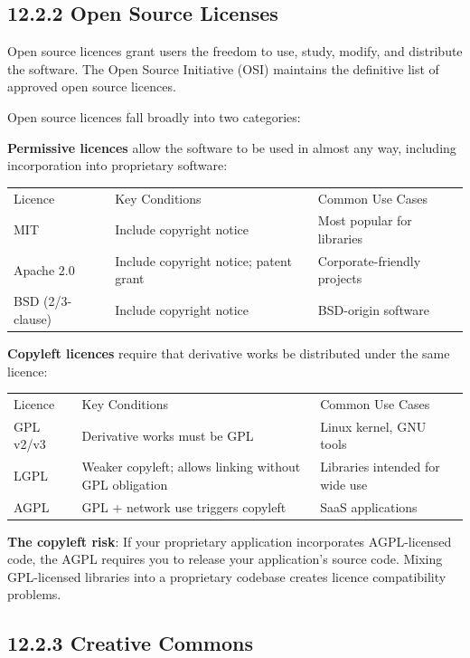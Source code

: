 \documentclass[11pt,a4paper]{book}
\begin{document}
\subsection{12.2.2 Open Source Licenses}

Open source licences grant users the freedom to use, study, modify, and distribute the software. The Open Source Initiative (OSI) maintains the definitive list of approved open source licences.

Open source licences fall broadly into two categories:

\textbf{Permissive licences} allow the software to be used in almost any way, including incorporation into proprietary software:

\begin{tabular}{lll}
\hline
Licence & Key Conditions & Common Use Cases \\
MIT & Include copyright notice & Most popular for libraries \\
Apache 2.0 & Include copyright notice; patent grant & Corporate-friendly projects \\
BSD (2/3-clause) & Include copyright notice & BSD-origin software \\
\hline
\end{tabular}

\textbf{Copyleft licences} require that derivative works be distributed under the same licence:

\begin{tabular}{lll}
\hline
Licence & Key Conditions & Common Use Cases \\
GPL v2/v3 & Derivative works must be GPL & Linux kernel, GNU tools \\
LGPL & Weaker copyleft; allows linking without GPL obligation & Libraries intended for wide use \\
AGPL & GPL + network use triggers copyleft & SaaS applications \\
\hline
\end{tabular}

\textbf{The copyleft risk}: If your proprietary application incorporates AGPL-licensed code, the AGPL requires you to release your application's source code. Mixing GPL-licensed libraries into a proprietary codebase creates licence compatibility problems.

\subsection{12.2.3 Creative Commons}
\end{document}
